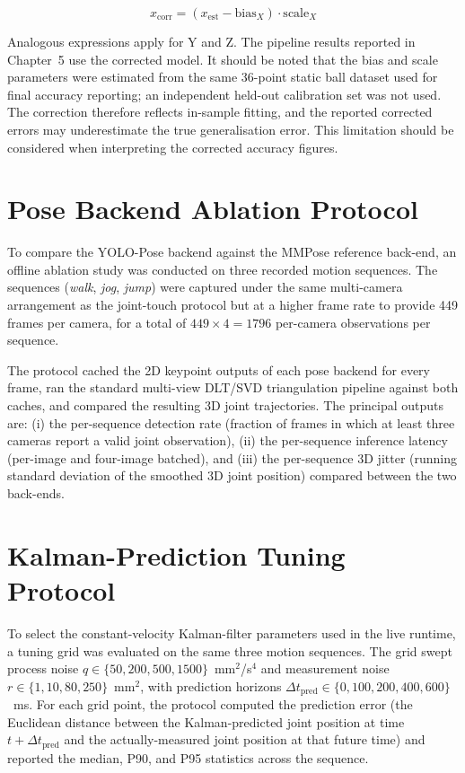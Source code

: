 \begin{equation}
x_{\text{corr}} = (x_{\text{est}} - \text{bias}_X) \cdot \text{scale}_X
\label{eqn:4_5_x_correction}
\end{equation}

Analogous expressions apply for Y and Z. The pipeline results reported in Chapter~5 use the corrected model. It should be noted that the bias and scale parameters were estimated from the same 36-point static ball dataset used for final accuracy reporting; an independent held-out calibration set was not used. The correction therefore reflects in-sample fitting, and the reported corrected errors may underestimate the true generalisation error. This limitation should be considered when interpreting the corrected accuracy figures.

\section{Pose Backend Ablation Protocol}

To compare the YOLO-Pose backend against the MMPose reference back-end, an offline ablation study was conducted on three recorded motion sequences. The sequences (\textit{walk}, \textit{jog}, \textit{jump}) were captured under the same multi-camera arrangement as the joint-touch protocol but at a higher frame rate to provide 449 frames per camera, for a total of $449 \times 4 = 1796$ per-camera observations per sequence.

The protocol cached the 2D keypoint outputs of each pose backend for every frame, ran the standard multi-view DLT/SVD triangulation pipeline against both caches, and compared the resulting 3D joint trajectories. The principal outputs are: (i) the per-sequence detection rate (fraction of frames in which at least three cameras report a valid joint observation), (ii) the per-sequence inference latency (per-image and four-image batched), and (iii) the per-sequence 3D jitter (running standard deviation of the smoothed 3D joint position) compared between the two back-ends.

\section{Kalman-Prediction Tuning Protocol}

To select the constant-velocity Kalman-filter parameters used in the live runtime, a tuning grid was evaluated on the same three motion sequences. The grid swept process noise $q \in \{50, 200, 500, 1500\}$~mm$^{2}$/s$^{4}$ and measurement noise $r \in \{1, 10, 80, 250\}$~mm$^{2}$, with prediction horizons $\Delta t_{\text{pred}} \in \{0, 100, 200, 400, 600\}$~ms. For each grid point, the protocol computed the prediction error (the Euclidean distance between the Kalman-predicted joint position at time $t + \Delta t_{\text{pred}}$ and the actually-measured joint position at that future time) and reported the median, P90, and P95 statistics across the sequence.

